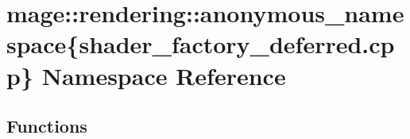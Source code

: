 \hypertarget{namespacemage_1_1rendering_1_1anonymous__namespace_02shader__factory__deferred_8cpp_03}{}\section{mage\+:\+:rendering\+:\+:anonymous\+\_\+namespace\{shader\+\_\+factory\+\_\+deferred.\+cpp\} Namespace Reference}
\label{namespacemage_1_1rendering_1_1anonymous__namespace_02shader__factory__deferred_8cpp_03}
\subsection*{Functions}
